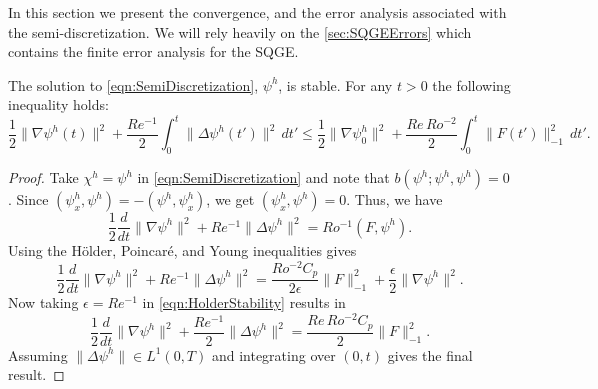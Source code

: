 In this section we present the convergence, and the error analysis associated
with the semi-discretization. We will rely heavily on the
\autoref{sec:SQGEErrors} which contains the finite error analysis for the SQGE.

\begin{prop} \label{prop:Stability}
  The solution to \eqref{eqn:SemiDiscretization}, $\psi^h$, is stable. For
  any $t>0$ the following inequality holds:
  \begin{equation}
    \frac{1}{2}\|\nabla \psi^h(t)\|^2 + \frac{Re^{-1}}{2}\int_{0}^{t}\! \|\Delta
      \psi^h(t')\|^2 \, dt' \le \frac{1}{2} \|\nabla \psi^h_0\|^2
      + \frac{Re\, Ro^{-2}}{2} \int_{0}^{t}\! \|F(t')\|^2_{-1}\, dt'.
    \label{eqn:Stability}
  \end{equation}
\end{prop}
\begin{proof}
  Take $\chi^h = \psi^h$ in \eqref{eqn:SemiDiscretization} and note that
  $b(\psi^h;\psi^h,\psi^h) = 0$. Since $(\psi^h_x,\psi^h) =
  -(\psi^h,\psi^h_x)$, we get $(\psi^h_x, \psi^h) = 0$. Thus, we have
  \begin{equation*}
    \frac{1}{2} \frac{d}{dt} \|\nabla \psi^h\|^2 + Re^{-1} \|\Delta \psi^h\|^2 =
      Ro^{-1} (F,\psi^h).
  \end{equation*}
  Using the H\"older, Poincar\'e, and Young inequalities gives
  \begin{equation}
    \frac{1}{2} \frac{d}{dt} \|\nabla \psi^h\|^2 + Re^{-1} \|\Delta \psi^h\|^2 =
      \frac{Ro^{-2} C_p}{2\epsilon} \|F\|_{-1}^2 + \frac{\epsilon}{2}\|\nabla
      \psi^h\|^2.
      \label{eqn:HolderStability}
  \end{equation}
  Now taking $\epsilon = Re^{-1}$ in \eqref{eqn:HolderStability} results in
  \begin{equation*}
    \frac{1}{2} \frac{d}{dt} \|\nabla \psi^h\|^2 + \frac{Re^{-1}}{2} \|\Delta
      \psi^h\|^2 = \frac{Re\,Ro^{-2} C_p}{2} \|F\|_{-1}^2.
  \end{equation*}
  Assuming $\|\Delta \psi^h\| \in L^1(0,T)$ and integrating over $(0,t)$ gives
  the final result.
\end{proof}

